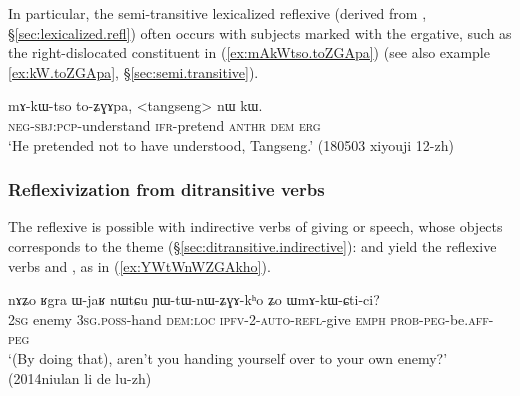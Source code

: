 In particular, the semi-transitive lexicalized reflexive  (derived from , §\ref{sec:lexicalized.refl}) often occurs with subjects marked with the ergative, such as the right-dislocated constituent  in (\ref{ex:mAkWtso.toZGApa})  (see also example \ref{ex:kW.toZGApa}, §\ref{sec:semi.transitive}).
 
 \begin{exe}
\ex \label{ex:mAkWtso.toZGApa}
 \gll  mɤ-kɯ-tso to-ʑɣɤpa, <tangseng> nɯ kɯ. \\
 \textsc{neg}-\textsc{sbj}:\textsc{pcp}-understand \textsc{ifr}-pretend  \textsc{anthr} \textsc{dem} \textsc{erg} \\
 \glt  `He pretended not to have understood, Tangseng.' (180503 xiyouji 12-zh)
 \end{exe}
% 
 
  \subsubsection{Reflexivization from ditransitive verbs} \label{sec:refl.ditransitive}
     
The reflexive is possible with indirective verbs of giving or speech, whose objects corresponds to the theme (§\ref{sec:ditransitive.indirective}):  and  yield the reflexive verbs  and , as in (\ref{ex:YWtWnWZGAkho}). 

\begin{exe}
\ex \label{ex:YWtWnWZGAkho}
 \gll nɤʑo ʁgra ɯ-jaʁ nɯtɕu ɲɯ-tɯ-nɯ-ʑɣɤ-kʰo ʑo ɯmɤ-kɯ-ɕti-ci? \\
 \textsc{2sg} enemy \textsc{3sg}.\textsc{poss}-hand \textsc{dem}:\textsc{loc} \textsc{ipfv}-2-\textsc{auto}-\textsc{refl}-give \textsc{emph} \textsc{prob}-\textsc{peg}-be.\textsc{aff}-\textsc{peg} \\
 \glt `(By doing that), aren't you handing yourself over to your own enemy?' (2014niulan li de lu-zh)
 \end{exe}
 
